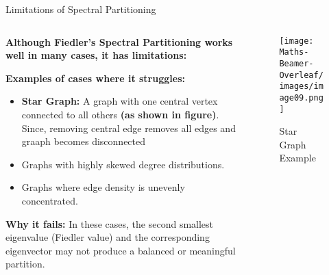 \documentclass[aspectratio=169]{beamer}
\begin{document}
\begin{frame}{Limitations of Spectral Partitioning}

\begin{columns}

    \begin{column}{0.7\textwidth}
        \textbf{Although Fiedler's Spectral Partitioning works well in many cases, it has limitations:}

        \vspace{0.3cm}
        \textbf{Examples of cases where it struggles:}
        \begin{itemize}
            \item \textbf{Star Graph:} A graph with one central vertex connected to all others \textbf{(as shown in figure)}.\\ Since, removing central edge removes all edges and graaph becomes disconnected
            \item Graphs with highly skewed degree distributions.
            \item Graphs where edge density is unevenly concentrated.
        \end{itemize}

        \vspace{0.3cm}
        \textbf{Why it fails:} In these cases, the second smallest eigenvalue (Fiedler value) and the corresponding eigenvector may not produce a balanced or meaningful partition.

    \end{column}

    \begin{column}{0.3\textwidth}
        \begin{figure}
            \centering
            \texttt{[image: Maths-Beamer-Overleaf/images/image09.png]}
            \caption*{\small Star Graph Example}
        \end{figure}
    \end{column}

\end{columns}

\end{frame}
\end{document}
